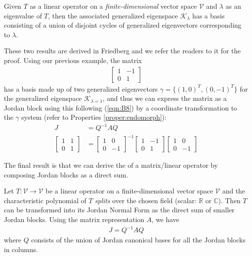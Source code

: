 \begin{thm}
\label{thm:B27}
Given $T$ as a linear operator on a \textit{finite-dimensional} vector space $\mathcal{V}$ and $\lambda$ as an eigenvalue of $T$, then the associated generalized eigenspace $\mathcal{K}_\lambda$ has a basis consisting of a union of disjoint cycles of generalized eigenvectors corresponding to $\lambda$.
\end{thm}
These two results are derived in Friedberg and we refer the readers to it for the proof. Using our previous example, the matrix
\begin{align*}
\begin{bmatrix}
1 & -1 \\
0 & 1
\end{bmatrix}    
\end{align*}
has a basis made up of two generalized eigenvectors $\gamma = \{(1,0)^T, (0,-1)^T\}$ for the generalized eigenspace $\mathcal{K}_{\lambda=1}$, and thus we can express the matrix as a Jordan block using this  following (\ref{eqn:B8}) by a coordinate transformation to the $\gamma$ system (refer to Properties \ref{proper:endomorph}):
\begin{align*}
J &= Q^{-1}AQ \\
\begin{bmatrix}
1 & 1 \\
0 & 1
\end{bmatrix} 
&=
\begin{bmatrix}
1 & 0 \\
0 & -1
\end{bmatrix}^{-1} 
\begin{bmatrix}
1 & -1 \\
0 & 1
\end{bmatrix} 
\begin{bmatrix}
1 & 0 \\
0 & -1
\end{bmatrix}
\end{align*}\par
The final result is that we can derive the  of a matrix/linear operator by composing Jordan blocks as a direct sum.
\begin{thm}
Let $T: \mathcal{V} \to \mathcal{V}$ be a linear operator on a finite-dimensional vector space $\mathcal{V}$ and the characteristic polynomial of $T$ \textit{splits} over the chosen field (scalar: $\mathbb{R}$ or $\mathbb{C}$). Then $T$ can be transformed into its Jordan Normal Form as the direct sum of smaller Jordan blocks. Using the matrix representation $A$, we have
\begin{align}
J = Q^{-1}AQ
\end{align}
where $Q$ consists of the union of Jordan canonical bases for all the Jordan blocks in columns.
\end{thm}
